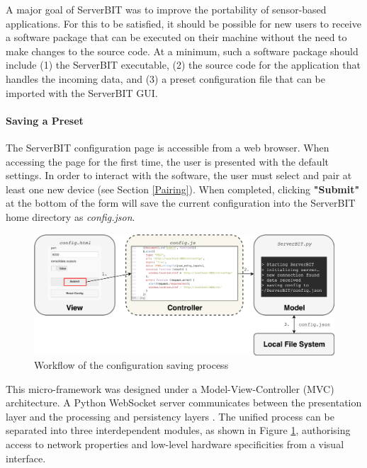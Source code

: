 A major goal of ServerBIT was to improve the portability of sensor-based applications. For this to be satisfied, it should be possible for new users to receive a software package that can be executed on their machine without the need to make changes to the source code. At a minimum, such a software package should include (1) the ServerBIT executable, (2) the source code for the application that handles the incoming data, and (3) a preset configuration file that can be imported with the ServerBIT GUI.

\paragraph{Saving a Preset}

The ServerBIT configuration page is accessible from a web browser. When accessing the page for the first time, the user is presented with the default settings. In order to interact with the software, the user must select and pair at least one new device (see Section \ref{Pairing}). When completed, clicking \textbf{"Submit"} at the bottom of the form will save the current configuration into the ServerBIT home directory as \textit{config.json}.

\begin{figure}[htb!]
    \centering
    \includegraphics[width=\textwidth]{Chapters/Figures/technical/ServerBIT/Websockets_ctrl.png}
    \caption{Workflow of the configuration saving process}
    \label{fig:MVC_Diagram}
\end{figure}

This micro-framework was designed under a Model-View-Controller (MVC) architecture. A Python WebSocket server communicates between the presentation layer and the processing and persistency layers \cite{da_silva_web-based_2012}. The unified process can be separated into three interdependent modules, as shown in Figure \ref{fig:MVC_Diagram}, authorising access to network properties and low-level hardware specificities from a visual interface.

